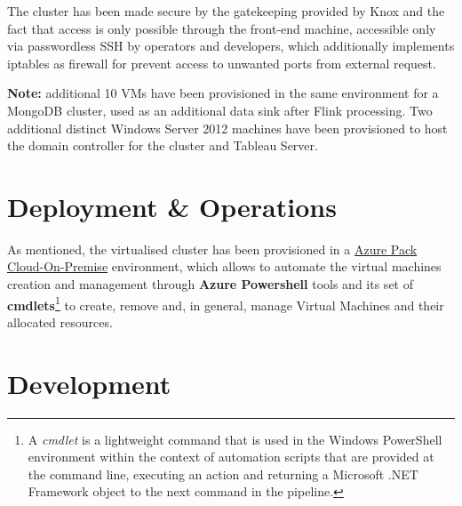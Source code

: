 The cluster has been made secure by the gatekeeping provided by Knox and the fact that access is only possible through the front-end machine, accessible only via passwordless SSH by operators and developers, which additionally implements iptables as firewall for prevent access to unwanted ports from external request.

\textbf{Note:} additional 10 VMs have been provisioned in the same environment for a MongoDB cluster, used as an additional data sink after Flink processing. Two additional distinct Windows Server 2012 machines have been provisioned to host the domain controller for the cluster and Tableau Server.

\section{Deployment \& Operations}

As mentioned, the virtualised cluster has been provisioned in a \href{https://www.microsoft.com/it-it/cloud-platform/windows-azure-pack}{Azure Pack Cloud-On-Premise} environment, which allows to automate the virtual machines creation and management through \textbf{Azure Powershell} tools and its set of \textbf{cmdlets}\footnote{A \textit{cmdlet} is a lightweight command that is used in the Windows PowerShell environment within the context of automation scripts that are provided at the command line, executing an action and returning a Microsoft .NET Framework object to the next command in the pipeline.} to create, remove and, in general, manage Virtual Machines and their allocated resources.







\section{Development}









